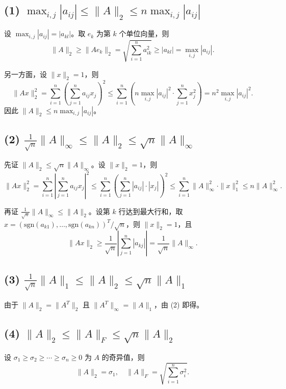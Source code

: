 \documentclass{article}
\begin{document}
\begin{solution}
  \subsection*{(1) $\max_{i,j} |a_{ij}| \leq \|A\|_2 \leq n
  \max_{i,j} |a_{ij}|$}

  设 $\max_{i,j} |a_{ij}| = |a_{kl}|$。取 $e_k$ 为第 $k$ 个单位向量，则
  \[
    \|A\|_2 \geq \|Ae_k\|_2 = \sqrt{\sum_{i=1}^n a_{ik}^2} \geq
    |a_{kl}| = \max_{i,j} |a_{ij}|.
  \]

  另一方面，设 $\|x\|_2 = 1$，则
  \[
    \|Ax\|_2^2 = \sum_{i=1}^n \left( \sum_{j=1}^n a_{ij} x_j
    \right)^2 \leq \sum_{i=1}^n \left( n \max_{i,j} |a_{ij}|^2 \cdot
    \sum_{j=1}^n x_j^2 \right) = n^2 \max_{i,j} |a_{ij}|^2.
  \]
  因此 $\|A\|_2 \leq n \max_{i,j} |a_{ij}|$。

  \subsection*{(2) $\frac{1}{\sqrt{n}} \|A\|_\infty \leq \|A\|_2 \leq
  \sqrt{n}\|A\|_\infty$}

  先证 $\|A\|_2 \leq \sqrt{n}\|A\|_\infty$。设 $\|x\|_2 = 1$，则
  \[
    \|Ax\|_2^2 = \sum_{i=1}^n \left| \sum_{j=1}^n a_{ij} x_j
    \right|^2 \leq \sum_{i=1}^n \left( \sum_{j=1}^n |a_{ij}| \cdot
    |x_j| \right)^2 \leq \sum_{i=1}^n \|A\|_\infty^2 \cdot \|x\|_1^2
    \leq n \|A\|_\infty^2.
  \]

  再证 $\frac{1}{\sqrt{n}} \|A\|_\infty \leq \|A\|_2$。设第 $k$ 行达到最大行和，取
  $x = (\text{sgn}(a_{k1}), \ldots, \text{sgn}(a_{kn}))^T /
  \sqrt{n}$，则 $\|x\|_2 = 1$，且
  \[
    \|Ax\|_2 \geq \frac{1}{\sqrt{n}} \left| \sum_{j=1}^n |a_{kj}|
    \right| = \frac{1}{\sqrt{n}} \|A\|_\infty.
  \]

  \subsection*{(3) $\frac{1}{\sqrt{n}} \|A\|_1 \leq \|A\|_2 \leq
  \sqrt{n}\|A\|_1$}

  由于 $\|A\|_2 = \|A^T\|_2$ 且 $\|A^T\|_\infty = \|A\|_1$，由 (2) 即得。

  \subsection*{(4) $\|A\|_2 \leq \|A\|_F \leq \sqrt{n}\|A\|_2$}

  设 $\sigma_1 \geq \sigma_2 \geq \cdots \geq \sigma_n \geq 0$ 为 $A$ 的奇异值，则
  \[
    \|A\|_2 = \sigma_1, \quad \|A\|_F = \sqrt{\sum_{i=1}^n \sigma_i^2}.
  \]


\end{solution}
\end{document}
